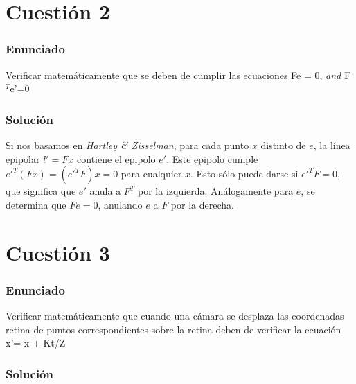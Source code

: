 
\section{Cuestión 2}

\subsubsection{Enunciado}

Verificar matemáticamente que se deben de cumplir las ecuaciones Fe = 0, \textit{and} F $ ^{T} $e'=0


\subsubsection{Solución}

Si nos basamos en \emph{Hartley \& Zisselman}, para cada punto $x$ distinto de $e$, la línea
epipolar $l'=Fx$ contiene el epipolo $e'$. Este epipolo cumple $e'^T(Fx)=(e'^TF)x=0$
para cualquier $x$. Esto sólo puede darse si $e'^TF=0$, que significa que $e'$
anula a $F^T$ por la izquierda. Análogamente para $e$, se determina que $Fe=0$,
anulando $e$ a $F$ por la derecha.


\section{Cuestión 3}

\subsubsection{Enunciado}

Verificar matemáticamente que cuando una cámara se desplaza las coordenadas retina de puntos correspondientes sobre la retina deben de verificar la ecuación x'= x + Kt/Z

\subsubsection{Solución}




